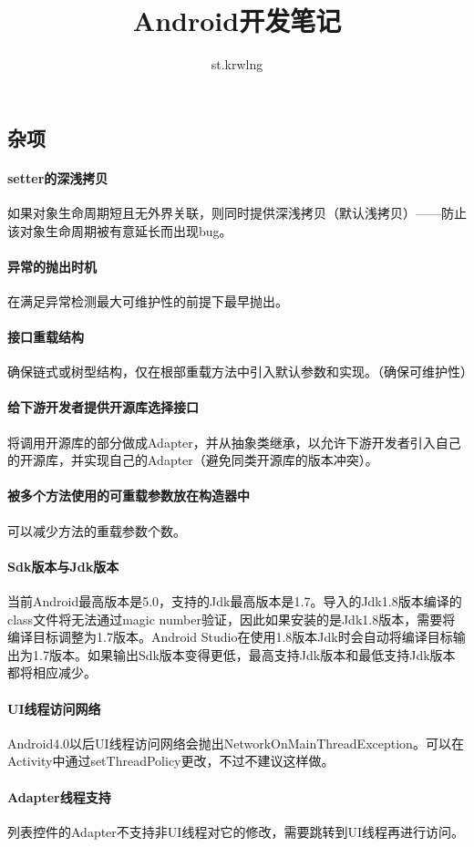 \documentclass[UTF8]{ctexart}
\title{Android开发笔记}
\author{st.krwlng}
\begin{document}
    \maketitle
    \tableofcontents
    \subsection{杂项}
    \paragraph{setter的深浅拷贝}
    如果对象生命周期短且无外界关联，则同时提供深浅拷贝（默认浅拷贝）——防止该对象生命周期被有意延长而出现bug。
    \paragraph{异常的抛出时机}
    在满足异常检测最大可维护性的前提下最早抛出。
    \paragraph{接口重载结构}
    确保链式或树型结构，仅在根部重载方法中引入默认参数和实现。（确保可维护性）
    \paragraph{给下游开发者提供开源库选择接口}
    将调用开源库的部分做成Adapter，并从抽象类继承，以允许下游开发者引入自己的开源库，并实现自己的Adapter（避免同类开源库的版本冲突）。
    \paragraph{被多个方法使用的可重载参数放在构造器中}
    可以减少方法的重载参数个数。
    \paragraph{Sdk版本与Jdk版本}
    当前Android最高版本是5.0，支持的Jdk最高版本是1.7。导入的Jdk1.8版本编译的class文件将无法通过magic number验证，因此如果安装的是Jdk1.8版本，需要将编译目标调整为1.7版本。Android Studio在使用1.8版本Jdk时会自动将编译目标输出为1.7版本。如果输出Sdk版本变得更低，最高支持Jdk版本和最低支持Jdk版本都将相应减少。
    \paragraph{UI线程访问网络}
    Android4.0以后UI线程访问网络会抛出NetworkOnMainThreadException。可以在Activity中通过setThreadPolicy更改，不过不建议这样做。
    \paragraph{Adapter线程支持}
    列表控件的Adapter不支持非UI线程对它的修改，需要跳转到UI线程再进行访问。
\end{document}
